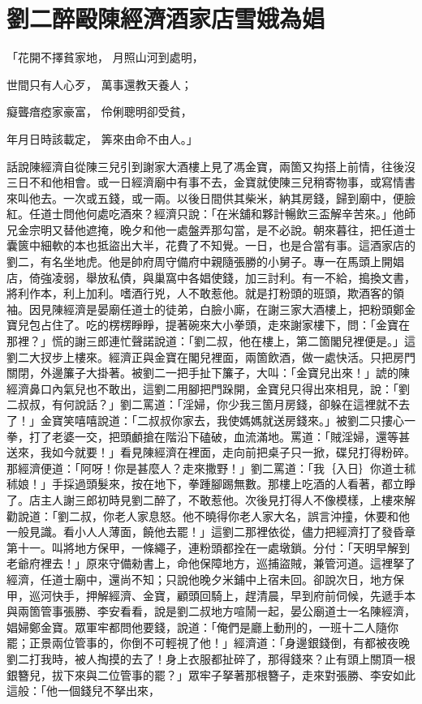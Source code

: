 %

\chapter{劉二醉毆陳經濟\KG 酒家店雪娥為娼}

「花開不擇貧家地，  月照山河到處明，

世間只有人心歹，  萬事還教天養人；

癡聾瘖瘂家豪富，  伶俐聰明卻受貧，

年月日時該載定，  筭來由命不由人。」

話說陳經濟自從陳三兒引到謝家大酒樓上見了馮金寶，兩箇又抅搭上前情，往後沒三日不和他相會。或一日經濟廟中有事不去，金寶就使陳三兒稍寄物事，或寫情書來叫他去。一次或五錢，或一兩。以後日間供其柴米，納其房錢，歸到廟中，便臉紅。任道士問他何處吃酒來？經濟只說：「在米舖和夥計暢飲三盃解辛苦來。」他師兄金宗明又替他遮掩，晚夕和他一處盤弄那勾當，是不必說。朝來暮往，把任道士囊篋中細軟的本也抵盜出大半，花費了不知覺。一日，也是合當有事。這酒家店的劉二，有名坐地虎。他是帥府周守備府中親隨張勝的小舅子。專一在馬頭上開娼店，倚強凌弱，舉放私債，與巢窩中各娼使錢，加三討利。有一不給，搗換文書，將利作本，利上加利。嗜酒行兇，人不敢惹他。就是打粉頭的班頭，欺酒客的領袖。因見陳經濟是晏廟任道士的徒弟，白臉小廝，在謝三家大酒樓上，把粉頭鄭金寶兒包占住了。吃的楞楞睜睜，提著碗來大小拳頭，走來謝家樓下，問：「金寶在那裡？」慌的謝三郎連忙聲諾說道：「劉二叔，他在樓上，第二箇閣兒裡便是。」這劉二大扠步上樓來。經濟正與金寶在閣兒裡面，兩箇飲酒，做一處快活。只把房門關閉，外邊簾子大掛著。被劉二一把手扯下簾子，大叫：「金寶兒出來！」諕的陳經濟鼻口內氣兒也不敢出，這劉二用腳把門跺開，金寶兒只得出來相見，說：「劉二叔叔，有何說話？」劉二罵道：「淫婦，你少我三箇月房錢，卻躲在這裡就不去了！」金寶笑嘻嘻說道：「二叔叔你家去，我使媽媽就送房錢來。」被劉二只摟心一拳，打了老婆一交，把頭顱搶在階沿下磕破，血流滿地。罵道：「賊淫婦，還等甚送來，我如今就要！」看見陳經濟在裡面，走向前把桌子只一掀，碟兒打得粉碎。那經濟便道：「阿呀！你是甚麼人？走來撒野！」劉二罵道：「我｛入日｝你道士秫秫娘！」手採過頭髮來，按在地下，拳踵腳踢無數。那樓上吃酒的人看著，都立睜了。店主人謝三郎初時見劉二醉了，不敢惹他。次後見打得人不像模樣，上樓來解勸說道：「劉二叔，你老人家息怒。他不曉得你老人家大名，誤言沖撞，休要和他一般見識。看小人人薄面，饒他去罷！」這劉二那裡依從，儘力把經濟打了發昏章第十一。叫將地方保甲，一條繩子，連粉頭都拴在一處墩鎖。分付：「天明早解到老爺府裡去！」原來守備勑書上，命他保障地方，巡捕盜賊，兼管河道。這裡拏了經濟，任道士廟中，還尚不知；只說他晚夕米鋪中上宿未回。卻說次日，地方保甲，巡河快手，押解經濟、金寶，顧頭回騎上，趕清晨，早到府前伺候，先遞手本與兩箇管事張勝、李安看看，說是劉二叔地方喧鬧一起，晏公廟道士一名陳經濟，娼婦鄭金寶。眾軍牢都問他要錢，說道：「俺們是廳上動刑的，一班十二人隨你罷；正景兩位管事的，你倒不可輕視了他！」經濟道：「身邊銀錢倒，有都被夜晚劉二打我時，被人掏摸的去了！身上衣服都扯碎了，那得錢來？止有頭上關頂一根銀簪兒，拔下來與二位管事的罷？」眾牢子拏著那根簪子，走來對張勝、李安如此這般：「他一個錢兒不拏出來，